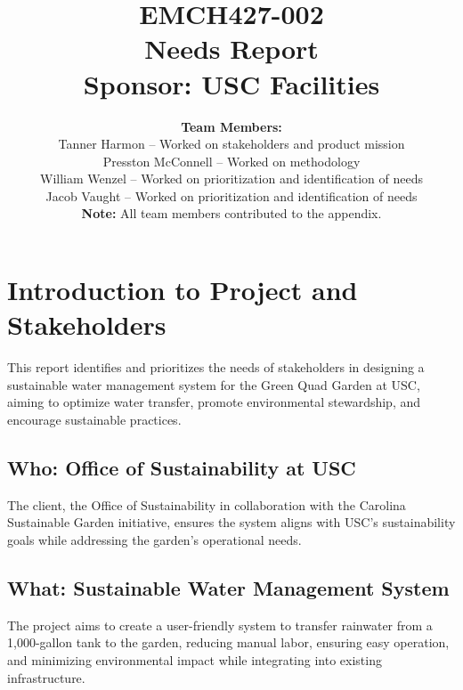\documentclass[11pt]{article}
\begin{document}
\title{
    \vspace{2in}
    \textbf{EMCH427-002} \\[1ex]
    \textbf{Needs Report} \\[1ex]
    \textbf{Sponsor: USC Facilities} \\[1ex]
    \vspace{2in}
}

\author{
    \textbf{Team Members:} \\[2ex]
    Tanner Harmon -- Worked on stakeholders and product mission \\[1ex]
    Presston McConnell -- Worked on methodology \\[1ex]
    William Wenzel -- Worked on prioritization and identification of needs \\[1ex]
    Jacob Vaught -- Worked on prioritization and identification of needs \\[2ex]
    \textbf{Note:} All team members contributed to the appendix.
}

\date{}

\maketitle
\thispagestyle{fancy} %

\newpage

\section{Introduction to Project and Stakeholders}

This report identifies and prioritizes the needs of stakeholders in designing a sustainable water management system for the Green Quad Garden at USC, aiming to optimize water transfer, promote environmental stewardship, and encourage sustainable practices.

\subsection{Who: Office of Sustainability at USC}
The client, the Office of Sustainability in collaboration with the Carolina Sustainable Garden initiative, ensures the system aligns with USC's sustainability goals while addressing the garden’s operational needs.

\subsection{What: Sustainable Water Management System}
The project aims to create a user-friendly system to transfer rainwater from a 1,000-gallon tank to the garden, reducing manual labor, ensuring easy operation, and minimizing environmental impact while integrating into existing infrastructure.
\end{document}
